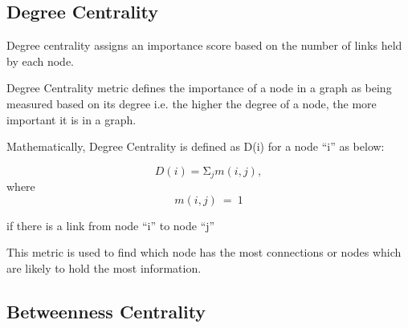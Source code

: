 \documentclass[12pt, a4paper]{article}
\begin{document}
    \subsection{Degree Centrality}
    \begin{flushleft}
    
    Degree centrality assigns an importance score based on the number of links held by each node.
    
   
    Degree Centrality metric defines the importance of a node in a graph as being measured based on its degree i.e. the higher the degree of a node, the more important it is in a graph.
    
    Mathematically, Degree Centrality is defined as D(i) for a node “i” as below:

    $$D\left(i\right)=\mathrm{\Sigma}_jm\left(i,j\right),$$ where $$m\left(i,j\right)\ =\ 1 $$ 
    
    if there is a link from node “i” to node “j”

    This metric is used to find which node has the most connections or nodes which are likely to hold the most information.
    \end{flushleft}
    \subsection{Betweenness Centrality}
\end{document}

